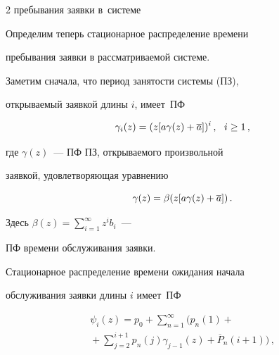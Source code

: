 \begin{multicols}{2}
{пребывания заявки в~системе}


\vspace*{-3pt}





Определим теперь стационарное распределение времени


пребывания заявки в рассматриваемой сис\-теме.





Заметим сначала, что период занятости системы (ПЗ),


открываемый заявкой длины $i$, имеет~ПФ


\begin{equation}


\gamma_i(z)     = (z[a\gamma(z)+\a])^i\,,


\ \ i\ge 1\,,


\label{e17p}


\end{equation}


где $\gamma(z)$~--- ПФ ПЗ, открываемого произвольной


заявкой, удовлетворяющая уравнению


\begin{equation}


\gamma(z) = \beta(z[a\gamma(z)+\a])\,.


\label{e18p}


\end{equation}


Здесь $ \beta(z) = \sum_{i=1}^\infty z^i b_i $~---


ПФ времени обслуживания заявки.





Стационарное распределение времени ожидания начала


обслуживания заявки длины $i$ имеет~ПФ





\noindent


\begin{multline}


\psi_i(z) = p_0 + \sum_{n=1}^\infty


\Bigg(


p_n(1) +{}\\


{}+ \sum_{j=2}^{i+1} p_n(j) \gamma_{j-1}(z) + \overline P_n(i+1)


\Bigg)\,,



\end{multline}
\end{multicols}
